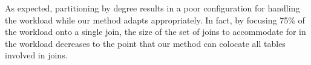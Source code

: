 As expected, partitioning by degree results in a poor configuration for handling the workload while our method adapts appropriately.  In fact, by focusing 75\% of the workload onto a single join, the size of the set of joins to accommodate for in the workload decreases to the point that our method can colocate all tables involved in joins.

\begin{table}
\centering
{}
\caption{\footnotesize{Results for query workload selected against degree
strategy.}}
\label{tab:antiDegree}
\end{table}



